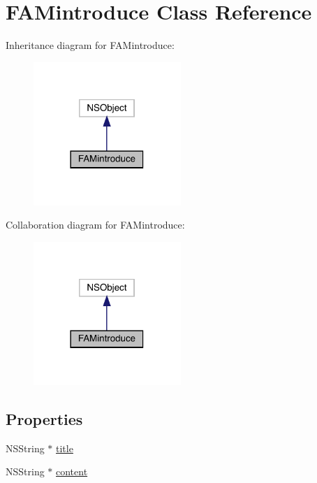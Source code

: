 \hypertarget{interface_f_a_mintroduce}{}\section{F\+A\+Mintroduce Class Reference}
\label{interface_f_a_mintroduce}


Inheritance diagram for F\+A\+Mintroduce\+:\nopagebreak
\begin{figure}[H]
\begin{center}
\leavevmode
\includegraphics[width=158pt]{interface_f_a_mintroduce__inherit__graph}
\end{center}
\end{figure}


Collaboration diagram for F\+A\+Mintroduce\+:\nopagebreak
\begin{figure}[H]
\begin{center}
\leavevmode
\includegraphics[width=158pt]{interface_f_a_mintroduce__coll__graph}
\end{center}
\end{figure}
\subsection*{Properties}
\begin{DoxyCompactItemize}
\item 
N\+S\+String $\ast$ \mbox{\hyperlink{interface_f_a_mintroduce_a06d163b570725a1485a7b768b24f72e0}{title}}
\item 
N\+S\+String $\ast$ \mbox{\hyperlink{interface_f_a_mintroduce_aeb82aa911e11969037993aea90c4de46}{content}}
\end{DoxyCompactItemize}


